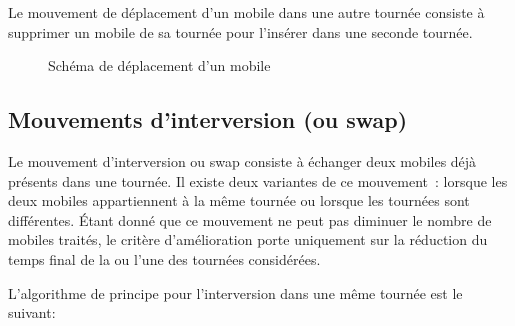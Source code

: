 			Le mouvement de déplacement d'un mobile dans une autre tournée consiste à supprimer un mobile de sa tournée pour l'insérer dans une seconde tournée.


			\begin{figure}[h!]
			\begin{subfigure}[b]{.54\linewidth}
				\centering
				\begin{tikzpicture}[schema]
					
				\end{tikzpicture}
				\label{subfig:move_move1route}
			\end{subfigure}
			\hfill
			\begin{subfigure}[b]{.45\linewidth}
				\centering
				\begin{tikzpicture}[schema]
					
				\end{tikzpicture}
				\label{subfig:move_move2routes}
			\end{subfigure}
			\caption{Schéma de déplacement d'un mobile}
			\label{fig:move_move}
			\end{figure}

		\subsection{Mouvements d'interversion (ou swap)}
			Le mouvement d'interversion ou swap consiste à échanger deux mobiles déjà présents dans une tournée. Il existe deux variantes de ce mouvement : lorsque les deux mobiles appartiennent à la même tournée ou lorsque les tournées sont différentes. Étant donné que ce mouvement ne peut pas diminuer le nombre de mobiles traités, le critère d'amélioration porte uniquement sur la réduction du temps final de la ou l'une des tournées considérées.

			L'algorithme de principe pour l'interversion dans une même tournée est le suivant:
			\begin{code}
				\begin{algo}[informal]
					\BEGIN
								\ENDFORGEN
							\ENDFORGEN
						\ENDFORGEN
					\END
				\end{algo}
			\end{code}

